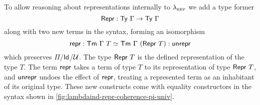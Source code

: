 To allow reasoning about representations internally to $\lambda_{\textsc{rep}}$ we add a
type former
\begin{equation}\label{eq:repr-ty}
	\textsf{Repr}{} : \textsf{Ty}\ \Gamma \to \textsf{Ty}\ \Gamma
\end{equation}
along with two new terms in the syntax, forming an isomorphism
\begin{equation}\label{eq:repr-iso}
	\textsf{repr}{} : \textsf{Tm}\ \Gamma\ T \simeq \textsf{Tm}\ \Gamma\ (\textsf{Repr}\ T) : \textsf{unrepr}{}
\end{equation}
which preserves $\Pi$/$\textsf{Id}$/$\mathcal{U}$. The type $\MRepr\ T$ is the
defined representation of the type $T$. The term $\textsf{repr}{}$ takes a term of type
$T$ to its representation of type
$\MRepr\ T$, and $\textsf{unrepr}{}$ undoes the effect of $\textsf{repr}{}$, treating a
represented term as an inhabitant of its original type. These new constructs
come with equality constructors in the syntax
shown in \cref{fig:lambdaind-repr-coherence-pi-univ}.
